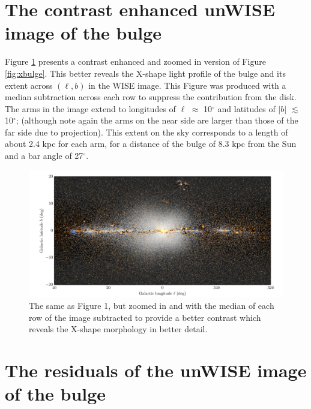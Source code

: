 \documentclass[12pt, preprint]{aastex}
\begin{document}
\section{The contrast enhanced unWISE image of the bulge}

Figure \ref{fig:filt} presents a contrast enhanced and zoomed in version of Figure \ref{fig:xbulge}. This better reveals the X-shape light profile of the bulge and its extent across $(\ell,b)$ in the WISE image. This Figure was produced with a median subtraction across each row to suppress the contribution from the disk. The arms in the image extend to longitudes of $\ell$ $\approx$ 10$^\circ$ and latitudes of $|b|$ $\lesssim$ 10$^\circ$; (although note again the arms on the near side are larger than those of the far side due to projection). This extent on the sky corresponds to a length of about 2.4 kpc for each arm, for a distance of the bulge of 8.3 kpc from the Sun and a bar angle of 27$^\circ$.

\begin{figure}[h!]
\centering
        \includegraphics[width=\textwidth]{xbulge-01}
\caption{The same as Figure 1, but zoomed in and with the median of each row of the image subtracted to provide a better contrast which reveals the X-shape morphology in better detail.}
\label{fig:filt}
\end{figure}

\section{The residuals of the unWISE image of the bulge}
\end{document}
